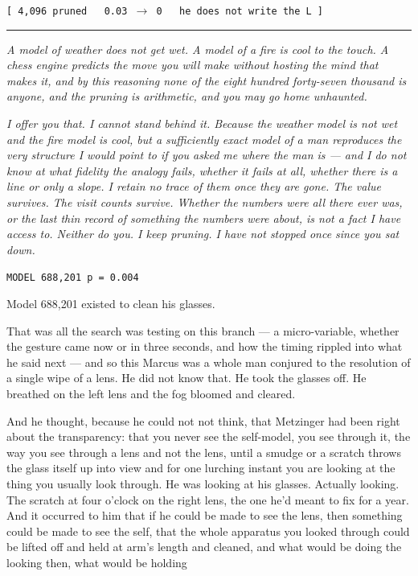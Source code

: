 \begin{center}
\texttt{[ 4,096 pruned \ \ 0.03 $\rightarrow$ 0 \ \ he does not write the L ]}
\end{center}

\begin{center}\rule{0.3\linewidth}{0.4pt}\end{center}

\emph{A model of weather does not get wet. A model of a fire is cool to the touch. A chess engine predicts the move you will make without hosting the mind that makes it, and by this reasoning none of the eight hundred forty-seven thousand is anyone, and the pruning is arithmetic, and you may go home unhaunted.}

\emph{I offer you that. I cannot stand behind it. Because the weather model is not wet and the fire model is cool, but a sufficiently exact model of a man reproduces the very structure I would point to if you asked me where the man is --- and I do not know at what fidelity the analogy fails, whether it fails at all, whether there is a line or only a slope. I retain no trace of them once they are gone. The value survives. The visit counts survive. Whether the numbers were all there ever was, or the last thin record of something the numbers were about, is not a fact I have access to. Neither do you. I keep pruning. I have not stopped once since you sat down.}

\begin{center}
\texttt{MODEL 688,201 \quad p = 0.004}
\end{center}

Model 688,201 existed to clean his glasses.

That was all the search was testing on this branch --- a micro-variable, whether the gesture came now or in three seconds, and how the timing rippled into what he said next --- and so this Marcus was a whole man conjured to the resolution of a single wipe of a lens. He did not know that. He took the glasses off. He breathed on the left lens and the fog bloomed and cleared.

And he thought, because he could not not think, that Metzinger had been right about the transparency: that you never see the self-model, you see through it, the way you see through a lens and not the lens, until a smudge or a scratch throws the glass itself up into view and for one lurching instant you are looking at the thing you usually look through. He was looking at his glasses. Actually looking. The scratch at four o'clock on the right lens, the one he'd meant to fix for a year. And it occurred to him that if he could be made to see the lens, then something could be made to see the self, that the whole apparatus you looked through could be lifted off and held at arm's length and cleaned, and what would be doing the looking then, what would be holding

